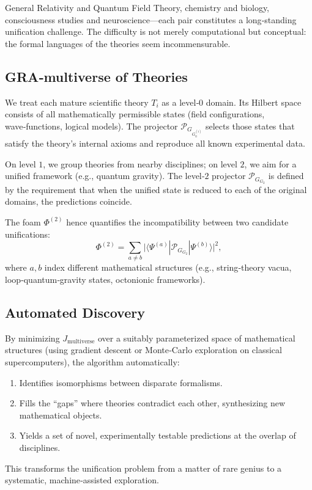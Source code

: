 \documentclass[11pt,a4paper]{article}
\theoremstyle{definition}
\newcommand{\pG}{\mathcal{P}_{\!G}}
\newcommand{\Foam}{\Phi}
\newcommand{\Jfunc}{J_{\text{multiverse}}}
\begin{document}
General Relativity and Quantum Field Theory, chemistry and biology, consciousness studies and neuroscience---each pair constitutes a long‑standing unification challenge. The difficulty is not merely computational but conceptual: the formal languages of the theories seem incommensurable.

\subsection{GRA‑multiverse of Theories}

We treat each mature scientific theory $T_i$ as a level‑$0$ domain. Its Hilbert space consists of all mathematically permissible states (field configurations, wave‑functions, logical models). The projector $\pG_{G_0^{(i)}}$ selects those states that satisfy the theory’s internal axioms and reproduce all known experimental data.

On level $1$, we group theories from nearby disciplines; on level $2$, we aim for a unified framework (e.g., quantum gravity). The level‑$2$ projector $\pG_{G_2}$ is defined by the requirement that when the unified state is reduced to each of the original domains, the predictions coincide.

The foam $\Foam^{(2)}$ hence quantifies the incompatibility between two candidate unifications:
\[
\Foam^{(2)} = \sum_{a\neq b} \bigl| \langle \Psi^{(a)} | \pG_{G_2} | \Psi^{(b)} \rangle \bigr|^2,
\]
where $a,b$ index different mathematical structures (e.g., string‑theory vacua, loop‑quantum‑gravity states, octonionic frameworks).

\subsection{Automated Discovery}

By minimizing $\Jfunc$ over a suitably parameterized space of mathematical structures (using gradient descent or Monte‑Carlo exploration on classical supercomputers), the algorithm automatically:
\begin{enumerate}
    \item Identifies isomorphisms between disparate formalisms.
    \item Fills the “gaps” where theories contradict each other, synthesizing new mathematical objects.
    \item Yields a set of novel, experimentally testable predictions at the overlap of disciplines.
\end{enumerate}
This transforms the unification problem from a matter of rare genius to a systematic, machine‑assisted exploration.
\end{document}
